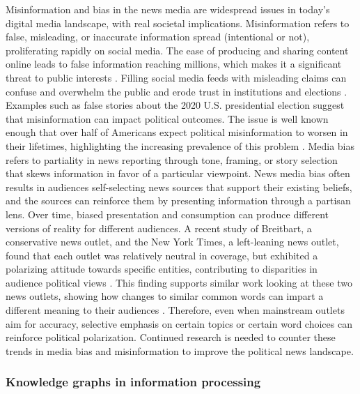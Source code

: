 \documentclass[11pt]{article}
\begin{document}
Misinformation and bias in the news media are widespread issues in today's digital media landscape, with real societal implications. Misinformation refers to false, misleading, or inaccurate information spread (intentional or not), proliferating rapidly on social media. The ease of producing and sharing content online leads to false information reaching millions, which makes it a significant threat to public interests \cite{r1}.
Filling social media feeds with misleading claims can confuse and overwhelm the public and erode trust in institutions and elections \cite{r2}. Examples such as false stories about the 2020 U.S. presidential election suggest that misinformation can impact political outcomes. The issue is well known enough that over half of Americans expect political misinformation to worsen in their lifetimes, highlighting the increasing prevalence of this problem \cite{r3}\cite{r4}. 
Media bias refers to partiality in news reporting through tone, framing, or story selection that skews information in favor of a particular viewpoint. News media bias often results in audiences self-selecting news sources that support their existing beliefs, and the sources can reinforce them by presenting information through a partisan lens. Over time, biased presentation and consumption can produce different versions of reality for different audiences.
A recent study of Breitbart, a conservative news outlet, and the New York Times, a left-leaning news outlet, found that each outlet was relatively neutral in coverage, but exhibited a polarizing attitude towards specific entities, contributing to disparities in audience political views \cite{r5}. This finding supports similar work looking at these two news outlets, showing how changes to similar common words can impart a different meaning to their audiences \cite{r6}. Therefore, even when mainstream outlets aim for accuracy, selective emphasis on certain topics or certain word choices can reinforce political polarization. Continued research is needed to counter these trends in media bias and misinformation to improve the political news landscape.

\subsubsection{Knowledge graphs in information processing}
\end{document}
